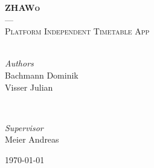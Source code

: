 \begin{titlepage}
	\textsc{\large \textbf{ZHAWo} \\[0.2cm]
									--- \\[0.3cm]}
	\textsc{\large Platform Independent Timetable App}\\[0.5cm]


	\HRule\\[1cm]


	\begin{minipage}{0.4\textwidth}
		\begin{flushleft}
			\large
			\textit{Authors}\\
			Bachmann Dominik \\
			Visser Julian %
		\end{flushleft}
	\end{minipage}
	~
	\begin{minipage}{0.4\textwidth}
		\begin{flushright}
			\large
			\textit{Supervisor}\\
			Meier Andreas %
		\end{flushright}
	\end{minipage}


	\vfill
	{\large\today} %

\end{titlepage}

